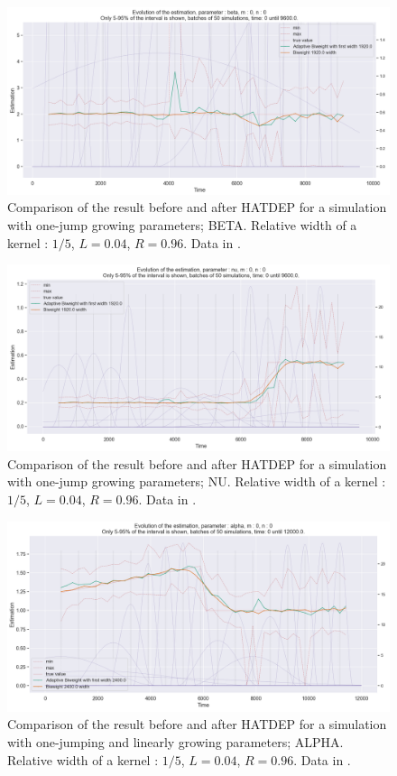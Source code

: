 \begin{figure}
\centering
\includegraphics[width = 0.90 \textwidth]{../imag/chap3/2_bis/Q.png}
\caption{Comparison of the result before and after HATDEP for a simulation with one-jump growing parameters; BETA. Relative width of a kernel : $1/5$, $L = 0.04$, $R = 0.96$. Data in \protect {}.}
\label{fig:second_estimate_2_beta}
\end{figure}

\begin{figure}
\centering
\includegraphics[width = 0.90 \textwidth]{../imag/chap3/2_bis/R.png}
\caption{Comparison of the result before and after HATDEP for a simulation with one-jump growing parameters; NU. Relative width of a kernel : $1/5$, $L = 0.04$, $R = 0.96$. Data in \protect {}.}
\label{fig:second_estimate_2_nu}
\end{figure}






\begin{figure}
\centering
\includegraphics[width = 0.90 \textwidth]{../imag/chap3/3_bis/P.png}
\caption{Comparison of the result before and after HATDEP for a simulation with one-jumping and linearly growing parameters; ALPHA. Relative width of a kernel : $1/5$, $L = 0.04$, $R = 0.96$. Data in \protect {}.}
\label{fig:second_estimate_3_alpha}
\end{figure}

